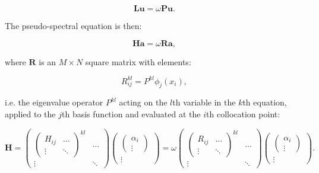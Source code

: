 \begin{equation}\label{eqn:ps-sw-eigenvalue}
  \textbf{L} \textbf{u} = \omega \textbf{P} \textbf{u}.
\end{equation}

The pseudo-spectral equation is then:

\begin{equation}
  \textbf{H} \textbf{a} = \omega \textbf{R} \textbf{a},
\end{equation}

 where $\textbf{R}$ is an $M \times N$ square matrix with elements:

\begin{equation}
  R^{kl}_{ij} = P^{kl}\phi_{j}(x_{i}),
\end{equation}

i.e. the eigenvalue operator $P^{kl}$ acting on the $l$th variable in the $k$th equation, applied to the $j$th basis function and evaluated at the $i$th collocation point:

\begin{equation}
    \textbf{H} =
  \begin{pmatrix}
    \begin{pmatrix}
H_{ij} & \dots \\
\vdots & \ddots
    \end{pmatrix}^{kl} & \dots \\
  \vdots & \ddots
  \end{pmatrix}
  \begin{pmatrix}
    \begin{pmatrix}
    \alpha_{i} \\
    \vdots
    \end{pmatrix} \\
  \vdots
  \end{pmatrix}
  =
  \omega
  \begin{pmatrix}
    \begin{pmatrix}
R_{ij} & \dots \\
\vdots & \ddots
    \end{pmatrix}^{kl} & \dots \\
  \vdots & \ddots
  \end{pmatrix}
  \begin{pmatrix}
    \begin{pmatrix}
    \alpha_{i} \\
    \vdots
    \end{pmatrix} \\
  \vdots
  \end{pmatrix}.
\end{equation}

